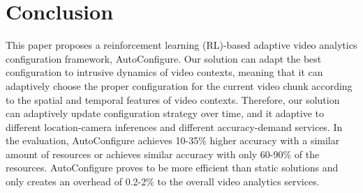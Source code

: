 \section{Conclusion}
\label{Section: conclusion}

This paper proposes a reinforcement learning (RL)-based adaptive video analytics configuration framework, AutoConfigure. Our solution can adapt the best configuration to intrusive dynamics of video contexts, meaning that it can adaptively choose the proper configuration for the current video chunk according to the spatial and temporal features of video contexts. Therefore, our solution can adaptively update configuration strategy over time, and it adaptive to different location-camera inferences and different accuracy-demand services. In the evaluation, AutoConfigure achieves 10-35\% higher accuracy with a similar amount of resources or achieves similar accuracy with only 60-90\% of the resources. AutoConfigure proves to be more efficient than static solutions and only creates an overhead of 0.2-2\% to the overall video analytics services. 